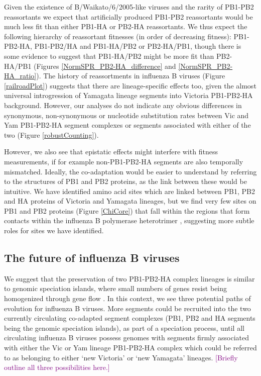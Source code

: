 \documentclass[11pt,oneside,letterpaper]{article}
\def\tbc#1{\textcolor{purple}{[#1]}}
\begin{document}
Given the existence of B/Waikato/6/2005-like viruses and the rarity of PB1-PB2 reassortants we expect that artificially produced PB1-PB2 reassortants would be much less fit than either PB1-HA or PB2-HA reassortants.
We thus expect the following hierarchy of reassortant fitnesses (in order of decreasing fitness): PB1-PB2-HA, PB1-PB2/HA and PB1-HA/PB2 or PB2-HA/PB1, though there is some evidence to suggest that PB1-HA/PB2 might be more fit than PB2-HA/PB1 (Figures \ref{NormSPR_PB2-HA_difference} and \ref{NormSPR_PB2-HA_ratio}).
The history of reassortments in influenza B viruses (Figure \ref{railroadPlot}) suggests that there are lineage-specific effects too, given the almost universal introgression of Yamagata lineage segments into Victoria PB1-PB2-HA background.
However, our analyses do not indicate any obvious differences in synonymous, non-synonymous or nucleotide substitution rates between Vic and Yam PB1-PB2-HA segment complexes or segments associated with either of the two (Figure \ref{robustCounting}).

However, we also see that epistatic effects might interfere with fitness measurements, if for example non-PB1-PB2-HA segments are also temporally mismatched.
Ideally, the co-adaptation would be easier to understand by referring to the structures of PB1 and PB2 proteins, as the link between these would be intuitive.
We have identified amino acid sites which are linked between PB1, PB2 and HA proteins of Victoria and Yamagata lineages, but we find very few sites on PB1 and PB2 proteins (Figure \ref{ChiCore}) that fall within the regions that form contacts within the influenza B polymerase heterotrimer \cite{sugiyama2009}, suggesting more subtle roles for sites we have identified.

\subsection*{The future of influenza B viruses}
We suggest that the preservation of two PB1-PB2-HA complex lineages is similar to genomic speciation islands, where small numbers of genes resist being homogenized through gene flow \cite{turner2005}.
In this context, we see three potential paths of evolution for influenza B viruses.
More segments could be recruited into the two currently circulating co-adapted segment complexes (PB1, PB2 and HA segments being the genomic speciation islands), as part of a speciation process, until all circulating influenza B viruses possess genomes with segments firmly associated with either the Vic or Yam lineage PB1-PB2-HA complex which could be referred to as belonging to either `new Victoria' or `new Yamagata' lineages.
\tbc{Briefly outline all three possibilities here.}
\end{document}
